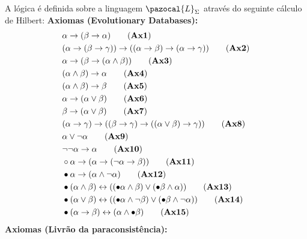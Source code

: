 \begin{definicao}[\lfium{}]
    \label{def:lfi1}
    A lógica \lfium{} é definida sobre a linguagem $\pazocal{L}_{\Sigma}$ através do seguinte cálculo de Hilbert:
    \noindent\textbf{Axiomas (Evolutionary Databases):}
    \begin{align*}
            & \alpha \rightarrow (\beta \rightarrow \alpha)\tag{\textbf{Ax1}}\\
            & (\alpha \rightarrow (\beta \rightarrow \gamma)) \rightarrow ((\alpha \rightarrow \beta) \rightarrow (\alpha \rightarrow \gamma ))\tag{\textbf{Ax2}}\\
            & \alpha \rightarrow (\beta \rightarrow (\alpha \land \beta))\tag{\textbf{Ax3}}\\
            & (\alpha \land \beta) \rightarrow \alpha\tag{\textbf{Ax4}}\\
            & (\alpha \land \beta) \rightarrow \beta\tag{\textbf{Ax5}}\\
            & \alpha \rightarrow (\alpha \lor \beta)\tag{\textbf{Ax6}}\\
            & \beta \rightarrow (\alpha \lor \beta)\tag{\textbf{Ax7}}\\
            & (\alpha \rightarrow \gamma) \rightarrow ((\beta \rightarrow \gamma) \rightarrow ((\alpha \lor \beta) \rightarrow \gamma))\tag{\textbf{Ax8}}\\
            & \alpha \lor \neg \alpha\tag{\textbf{Ax9}}\\
            & \neg \neg \alpha \rightarrow \alpha\tag{\textbf{Ax10}}\\
            & \circ \alpha \rightarrow (\alpha \rightarrow (\neg \alpha \rightarrow \beta))\tag{\textbf{Ax11}}\\
            & \bullet \alpha \rightarrow (\alpha \land \neg \alpha)\tag{\textbf{Ax12}}\\
            & \bullet (\alpha \land \beta) \leftrightarrow ((\bullet \alpha \land \beta) \lor (\bullet \beta \land \alpha))\tag{\textbf{Ax13}}\\
            & \bullet (\alpha \lor \beta) \leftrightarrow ((\bullet \alpha \land \neg \beta) \lor (\bullet \beta \land \neg \alpha))\tag{\textbf{Ax14}}\\
            & \bullet (\alpha \rightarrow \beta) \leftrightarrow (\alpha \land \bullet \beta)\tag{\textbf{Ax15}}
    \end{align*}
    \noindent\textbf{Axiomas (Livrão da paraconsistência):}

\end{definicao}
